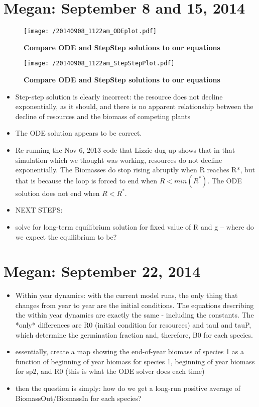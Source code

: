 \documentclass[11pt,a4paper,oneside]{article}
\begin{document}
\section{Megan: September 8 and  15, 2014}
\begin{figure}[h!]
\centering
\noindent \texttt{[image: /20140908\_1122am\_ODEplot.pdf]}
\caption{{\bf Compare ODE and StepStep solutions to our equations}}
\end{figure}

\begin{figure}[h!]
\centering
\noindent \texttt{[image: /20140908\_1122am\_StepStepPlot.pdf]}
\caption{{\bf Compare ODE and StepStep solutions to our equations}}
\end{figure}

\begin{itemize}
\item Step-step solution is clearly incorrect: the resource does not decline exponentially, as it should, and there is no apparent relationship between the decline of resources and the biomass of competing plants
\item The ODE solution appears to be correct.
\item Re-running the Nov 6, 2013 code that Lizzie dug up shows that in that simulation which we thought was working, resources do not decline exponentially.  The Biomasses do stop rising abruptly when R reaches R*, but that is because the loop is forced to end when $R < min(R^{*})$.  The ODE solution does not end when $R<R^{*}$.
\item NEXT  STEPS: 
\item solve for long-term equilibrium solution for fixed value of R and g -- where do we expect the equilibrium to be?
\end{itemize}

\section{Megan: September 22, 2014}
\begin{itemize}
\item Within year dynamics: with the current model runs, the only thing that changes from year to year are the initial conditions.  The equations describing the within year dynamics are exactly the same - including the constants.  The *only* differences are R0 (initial condition for resources) and tauI and tauP, which determine the germination fraction and, therefore, B0 for each species.
\item essentially, create a map showing the end-of-year biomass of species 1 as a function of beginning of year biomass for species 1, beginning of year biomass for sp2, and R0 (this is what the ODE solver does each time)
\item then the question is simply: how do we get a long-run positive average of BiomassOut/BiomassIn for each species?  
\end{itemize}
\end{document}
